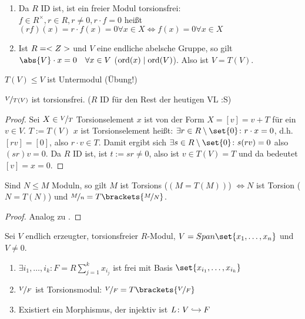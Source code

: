 \begin{example}
	\begin{enumerate}
		\item Da $R$ ID ist, ist ein freier Modul torsionsfrei:\\
		$f \in R^{\times}, r \in R, r \neq 0, r \cdot f = 0$ heißt $(rf)(x) = r \cdot f(x) = 0 \forall x \in X \Leftrightarrow f(x) = 0 \forall x \in X$
		\item Ist $R = <Z>$ und $V$ eine endliche abelsche Gruppe, so gilt $\abs{V}\cdot x = 0\quad \forall x \in V$ ($\operatorname{ord}(x) \mid \operatorname{ord}(V)$). Also ist $V = T(V)$.
	\end{enumerate}
\end{example}
\begin{*remark}
	$T(V) \le V$ ist Untermodul (Übung!)
\end{*remark}
\begin{lemma}
	$\lnkset{V}{T(V)}$ ist torsionsfrei. ($R$ ID für den Rest der heutigen VL :S)
\end{lemma}
\begin{proof}
	Sei $X \in \lnkset{V}{T}$ Torsionselement $x$ ist von der Form $X = [v] = v + T$ für ein $v\in V$. $T := T(V)$ $x$ ist Torsionselement heißt: $\exists r \in R \setminus \set{0}\colon r \cdot x = 0$, d.h. $[rv] = [0]$, also $r \cdot v \in T$. Damit ergibt sich $\exists s \in R \setminus \set{0}\colon s(rv) = 0$ also $(sr)v = 0$. Da $R$ ID ist, ist $t:= sr \neq 0$, also ist $v \in T(V) = T$ und da bedeutet $[v] = x = 0$.
\end{proof}
\begin{lemma}
	Sind $N \le M$ Moduln, so gilt $M$ ist Torsions ($(M = T(M))$) $\Leftrightarrow N$ ist Torsion ($N = T(N)$) und $\lnkset{M}{n} = T\brackets{\lnkset{M}{N}}$.
\end{lemma}
\begin{proof}
	Analog zu .
\end{proof}
\begin{proposition}
	Sei $V$ endlich erzeugter, torsionsfreier $R$-Modul, $V = Span\set{x_1, \dots, x_n}$ und $V \neq 0$.
	\begin{enumerate}
		\item $\exists i_1, \dots, i_k \colon F = R\sum_{j=1}^k x_{i_j}$ ist frei mit Basis $\set{x_{i_1}, \dots, x_{i_k}}$
		\item $\lnkset{V}{F}$ ist Torsionsmodul: $\lnkset{V}{F} = T\brackets{\lnkset{V}{F}}$
		\item Existiert ein Morphismus, der injektiv ist $L \colon \begin{tikzcd}[cramped, sep=small]
		V \arrow[r, hook] & F
		\end{tikzcd}$
	\end{enumerate}
\end{proposition}

